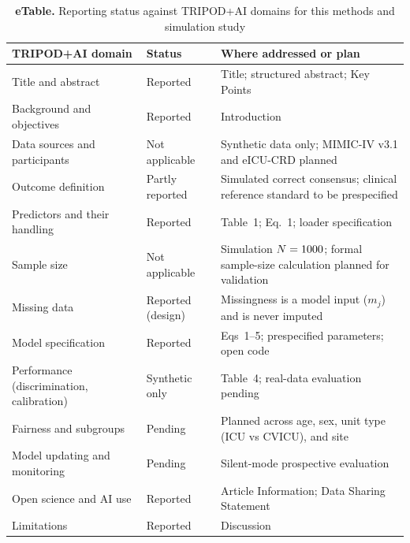 \documentclass[11pt]{article}
\begin{document}
\medskip
\begin{table}[ht]\centering\small
\caption*{\textbf{eTable.} Reporting status against TRIPOD+AI\cite{tripodai} domains for this methods and simulation study}
\begin{tabularx}{\linewidth}{p{4.2cm}p{2.4cm}Y}
\toprule
TRIPOD+AI domain & Status & Where addressed or plan\\
\midrule
Title and abstract & Reported & Title; structured abstract; Key Points\\
Background and objectives & Reported & Introduction\\
Data sources and participants & Not applicable & Synthetic data only; MIMIC-IV v3.1 and eICU-CRD planned\\
Outcome definition & Partly reported & Simulated correct consensus; clinical reference standard to be prespecified\\
Predictors and their handling & Reported & Table~1; Eq.~1; loader specification\\
Sample size & Not applicable & Simulation $N=1000$; formal sample-size calculation planned for validation\\
Missing data & Reported (design) & Missingness is a model input ($m_j$) and is never imputed\\
Model specification & Reported & Eqs~1--5; prespecified parameters; open code\\
Performance (discrimination, calibration) & Synthetic only & Table~4; real-data evaluation pending\\
Fairness and subgroups & Pending & Planned across age, sex, unit type (ICU vs CVICU), and site\\
Model updating and monitoring & Pending & Silent-mode prospective evaluation\\
Open science and AI use & Reported & Article Information; Data Sharing Statement\\
Limitations & Reported & Discussion\\
\bottomrule
\end{tabularx}
\end{table}
\end{document}

